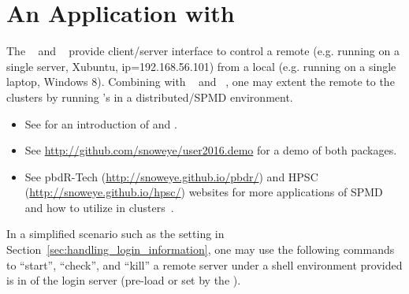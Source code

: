 
\section[An Application with \pkg{remoter}]{An Application with }
\label{sec:application_rr}

The ~\citep{remoter} and ~\citep{Chen2015pbdZMQpackage}
provide client/server interface to control a remote 
(e.g. running on a single server, Xubuntu, ip=192.168.56.101)
from a local  (e.g. running on a single laptop, Windows 8).
Combining with ~\citep{Chen2012pbdMPIpackage} and
~\citep{pbdCS}, one may extent the
remote  to the  clusters by running
's in a distributed/SPMD environment.
\begin{itemize}
\item See \citet{xsede16} for an introduction of  and .
\item See \url{http://github.com/snoweye/user2016.demo}
      for a demo of both packages.
\item See pbdR-Tech (\url{http://snoweye.github.io/pbdr/}) and
      HPSC (\url{http://snoweye.github.io/hpsc/}) websites
      for more applications of SPMD and
      how to utilize  in clusters~\citep{hpsc2012}.
\end{itemize}

In a simplified scenario such as the setting in
Section~\ref{sec:handling_login_information}, one may use the following
commands to ``start'', ``check'', and ``kill'' a remote  server
under a shell environment provided  is in 
of the login server (pre-load or set by the ).

